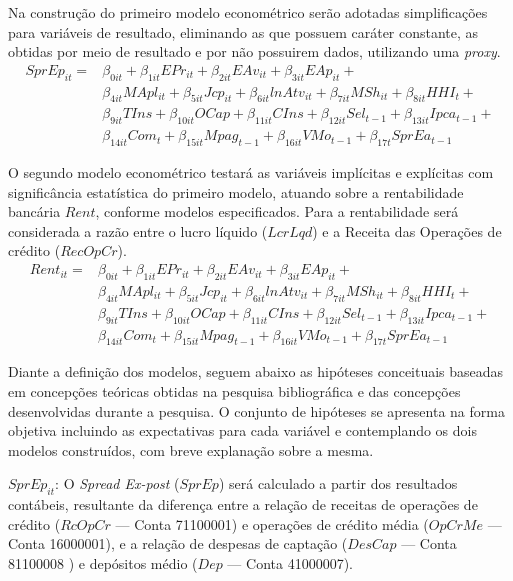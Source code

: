 \documentclass[12pt,12pt,openright,oneside,a4paper,chapter=TITLE,section=TITLE,subsection=TITLE,subsubsection=TITLE,english,french,spanish,portugues,sumario=tradicional]{abntex2}
\begin{document}
Na construção do primeiro modelo econométrico serão adotadas simplificações para variáveis de resultado, eliminando as que possuem caráter constante, as obtidas por meio de resultado e por não possuirem dados, utilizando uma \emph{proxy}.
\[\begin{aligned}
SprEp_{it} = & \beta_{0it} + \beta_{1it}EPr_{it} + \beta_{2it}EAv_{it} + \beta_{3it}EAp_{it} + \\
&\beta_{4it}MApl_{it} + \beta_{5it}Jcp_{it}  + \beta_{6it}lnAtv_{it} + \beta_{7it}MSh_{it}  + \beta_{8it}HHI_{t} + \\
& \beta_{9it}TIns + \beta_{10it}OCap + \beta_{11it}CIns + \beta_{12it}Sel_{t-1} + \beta_{13it}Ipca_{t-1} + \\
& \beta_{14it}Com_{t} + \beta_{15it}Mpag_{t-1} + \beta_{16it}VMo_{t-1} +  \beta_{17t}SprEa_{t-1}
\end{aligned}\]

O segundo modelo econométrico testará as variáveis implícitas e explícitas com significância estatística do primeiro modelo, atuando sobre a rentabilidade bancária \(Rent\), conforme modelos especificados. Para a rentabilidade será considerada a razão entre o lucro líquido (\(LcrLqd\)) e a Receita das Operações de crédito (\(RecOpCr\)).
\[\begin{aligned}
Rent_{it} = & \beta_{0it} + \beta_{1it}EPr_{it} + \beta_{2it}EAv_{it} + \beta_{3it}EAp_{it} + \\
&\beta_{4it}MApl_{it} + \beta_{5it}Jcp_{it}  + \beta_{6it}lnAtv_{it} + \beta_{7it}MSh_{it}  + \beta_{8it}HHI_{t} + \\
& \beta_{9it}TIns + \beta_{10it}OCap + \beta_{11it}CIns + \beta_{12it}Sel_{t-1} + \beta_{13it}Ipca_{t-1} + \\
& \beta_{14it}Com_{t} + \beta_{15it}Mpag_{t-1} + \beta_{16it}VMo_{t-1} +  \beta_{17t}SprEa_{t-1}
\end{aligned}\]

Diante a definição dos modelos, seguem abaixo as hipóteses conceituais baseadas em concepções teóricas obtidas na pesquisa bibliográfica e das concepções desenvolvidas durante a pesquisa. O conjunto de hipóteses se apresenta na forma objetiva incluindo as expectativas para cada variável e contemplando os dois modelos construídos, com breve explanação sobre a mesma.

\(SprEp_{it}\): O \emph{Spread Ex-post} (\(SprEp\)) será calculado a partir dos resultados contábeis, resultante da diferença entre a relação de receitas de operações de crédito (\(RcOpCr\) --- Conta 71100001) e operações de crédito média (\(OpCrMe\) --- Conta 16000001), e a relação de despesas de captação (\(DesCap\) --- Conta 81100008 ) e depósitos médio (\(Dep\) --- Conta 41000007).
\end{document}
